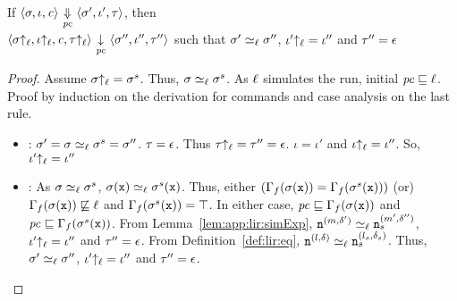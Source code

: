 \begin{myThm}
\label{thm:app:lir:sim}
If $\langle \sigma, \iota, \mathit{c} \rangle
{~\underset{\mathit{pc}}{\Downarrow}~} \langle \sigma', \iota', \tau \rangle$,
then\\ 
$\langle \sigma{\uparrow_\ell}, \iota{\uparrow_\ell}, \mathit{c}, \tau{\uparrow_\ell}
\rangle  {~\underset{\mathit{pc}}{\downarrow}~} \langle \sigma'',\iota'',
\tau'' \rangle$ such that 
$\sigma' \simeq_\ell \sigma''$,
$\iota'{\uparrow_\ell} = \iota''$ and $\tau'' = \epsilon$ 
\end{myThm}
\begin{proof}
  Assume $\sigma{\uparrow_\ell} = \sigma^s$. Thus, $\sigma \simeq_\ell
  \sigma^s$. As $\ell$ simulates the run, initial $\mathit{pc} \sqsubseteq
  \ell$. 
  Proof by induction on the derivation for commands and case analysis on
  the last rule.

  \begin{itemize}[leftmargin=.5in]
  \item {}: $\sigma'=\sigma \simeq_\ell \sigma^s =
    \sigma''$. $\tau =\epsilon$. Thus $\tau{\uparrow_\ell} = \tau'' = 
    \epsilon$.  $\iota = \iota'$ and $\iota{\uparrow_\ell}=\iota''$. So,
    $\iota'{\uparrow_\ell} = \iota''$

  \item {}: As $\sigma \simeq_\ell \sigma^s$, $\sigma(\texttt{x})
    \simeq_\ell \sigma^s(\texttt{x})$. Thus, either $(\Gamma_f(\sigma(\texttt{x})) =
    \Gamma_f(\sigma^s(\texttt{x})))$ (or) $\Gamma_f(\sigma(\texttt{x})) \not\sqsubseteq
    \ell$ and $\Gamma_f(\sigma^s(\texttt{x})) = \top$. In either case, $\mathit{pc}
    \sqsubseteq \Gamma_f(\sigma(\texttt{x}))$ and $\mathit{pc}
    \sqsubseteq \Gamma_f(\sigma^s(\texttt{x}))$. From Lemma~\ref{lem:app:lir:simExp}, 
    $\texttt{n}^{(m, \delta')} \simeq_\ell \texttt{n}_s^{(m', \delta'')}$, $\iota'{\uparrow_\ell} =
    \iota''$ and $\tau'' = \epsilon$. From
    Definition~\ref{def:lir:eq}, $\texttt{n}^{(l, \delta)} \simeq_\ell \texttt{n}_s^{(l_s,
      \delta_s)}$. Thus, $\sigma' \simeq_\ell \sigma''$, $\iota'{\uparrow_\ell} =
    \iota''$ and $\tau'' = \epsilon$. 
    

\end{itemize}
\end{proof}
